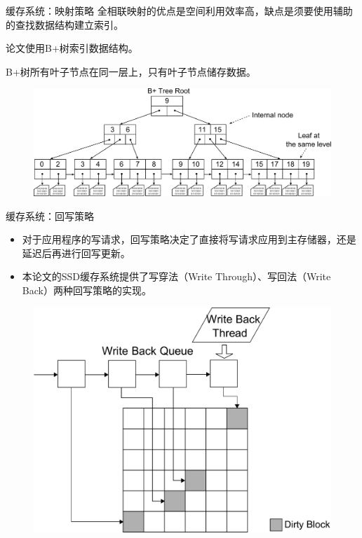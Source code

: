 \documentclass[compress]{beamer}
\begin{document}
\begin{frame}{缓存系统：映射策略}
全相联映射的优点是空间利用效率高，缺点是须要使用辅助的查找数据结构建立索引。

论文使用B+树索引数据结构。

B+树所有叶子节点在同一层上，只有叶子节点储存数据。
\begin{figure}
\includegraphics[width=0.9\linewidth]{../graph/bplus-tree}
\end{figure}
\end{frame}

\begin{frame}{缓存系统：回写策略}
\begin{itemize}
\item 对于应用程序的写请求，回写策略决定了直接将写请求应用到主存储器，还是延迟后再进行回写更新。
\item 本论文的SSD缓存系统提供了写穿法（Write Through）、写回法（Write Back）两种回写策略的实现。
\end{itemize}
\begin{figure}
\includegraphics[width=0.6\linewidth]{../graph/write-back-queue}
\end{figure}
\end{frame}
\end{document}

